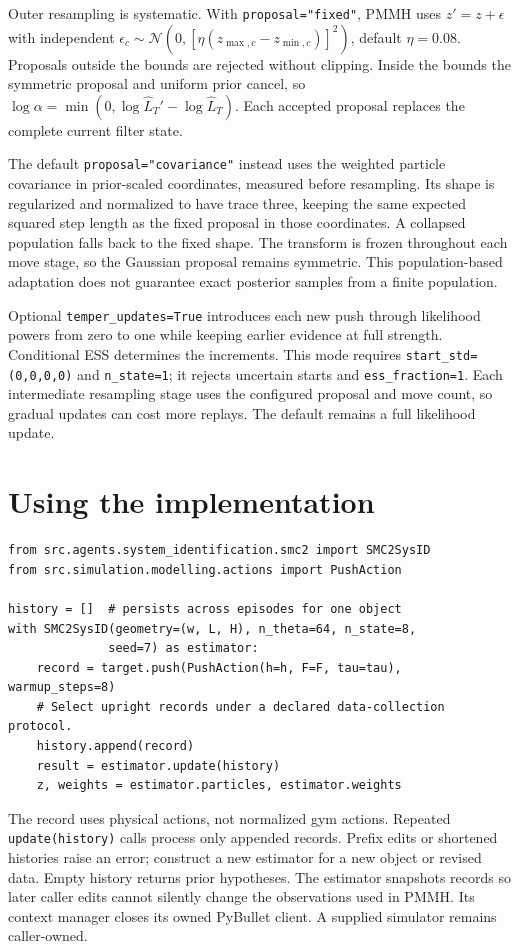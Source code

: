 \documentclass[11pt]{article}
\begin{document}
Outer resampling is systematic. With \texttt{proposal="fixed"}, PMMH uses
$z'=z+\epsilon$ with independent
$\epsilon_c\sim\mathcal N(0,[\eta(z_{\max,c}-z_{\min,c})]^2)$,
default $\eta=0.08$. Proposals outside the bounds are rejected without
clipping. Inside the bounds the symmetric proposal and uniform prior
cancel, so $\log\alpha=\min(0,\log\widehat L_T'-\log\widehat L_T)$.
Each accepted proposal replaces the complete current filter state.

The default \texttt{proposal="covariance"} instead uses the weighted
particle covariance in prior-scaled coordinates, measured before resampling.
Its shape is regularized and normalized to have trace three, keeping the same
expected squared step length as the fixed proposal in those coordinates.
A collapsed population falls back to the fixed shape. The transform is frozen
throughout each move stage, so the Gaussian proposal remains symmetric.
This population-based adaptation does not guarantee exact posterior samples
from a finite population.

Optional \texttt{temper\_updates=True} introduces each new push through
likelihood powers from zero to one while keeping earlier evidence at full
strength. Conditional ESS determines the increments. This mode requires
\texttt{start\_std=(0,0,0,0)} and \texttt{n\_state=1}; it rejects uncertain
starts and \texttt{ess\_fraction=1}. Each intermediate resampling stage uses
the configured proposal and move count, so gradual updates can cost more
replays. The default remains a full likelihood update.

\section{Using the implementation}
\begin{verbatim}
from src.agents.system_identification.smc2 import SMC2SysID
from src.simulation.modelling.actions import PushAction

history = []  # persists across episodes for one object
with SMC2SysID(geometry=(w, L, H), n_theta=64, n_state=8,
              seed=7) as estimator:
    record = target.push(PushAction(h=h, F=F, tau=tau), warmup_steps=8)
    # Select upright records under a declared data-collection protocol.
    history.append(record)
    result = estimator.update(history)
    z, weights = estimator.particles, estimator.weights
\end{verbatim}
The record uses physical actions, not normalized gym actions. Repeated
\texttt{update(history)} calls process only appended records. Prefix
edits or shortened histories raise an error; construct a new estimator
for a new object or revised data. Empty history returns prior hypotheses.
The estimator snapshots records so later caller edits cannot silently
change the observations used in PMMH. Its context manager closes its
owned PyBullet client. A supplied simulator remains caller-owned.
\end{document}
